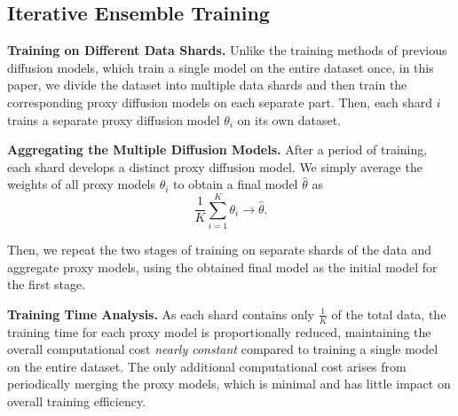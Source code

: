 \subsection{Iterative Ensemble Training}


\textbf{Training on Different Data Shards.} Unlike the training methods of previous diffusion models, which train a single model on the entire dataset once, in this paper, we divide the dataset into multiple data shards and then train the corresponding proxy diffusion models on each separate part. 
Then, each shard $i$ trains a separate proxy diffusion model $\theta_{i}$ on its own dataset.

\textbf{Aggregating the Multiple Diffusion Models.} After a period of training, each shard develops a distinct proxy diffusion model. We simply average the weights of all proxy models $\theta_{i}$ to obtain a final model $\hat{\theta}$ as
\begin{equation}\label{eq:average}
    \frac{1}{K}\sum_{i = 1}^{K}\theta_{i} \rightarrow \hat{\theta}.
\end{equation}

Then, we repeat the two stages of training on separate shards of the data and aggregate proxy models, using the obtained final model as the initial model for the first stage.

\textbf{Training Time Analysis.}
As each shard contains only $\frac{1}{K}$ of the total data, the training time for each proxy model is proportionally reduced,
maintaining the overall computational cost \emph{nearly constant} compared to training a single model on the entire dataset. 
The only additional computational cost arises from periodically merging the proxy models, which is minimal and has little impact on overall training efficiency.

